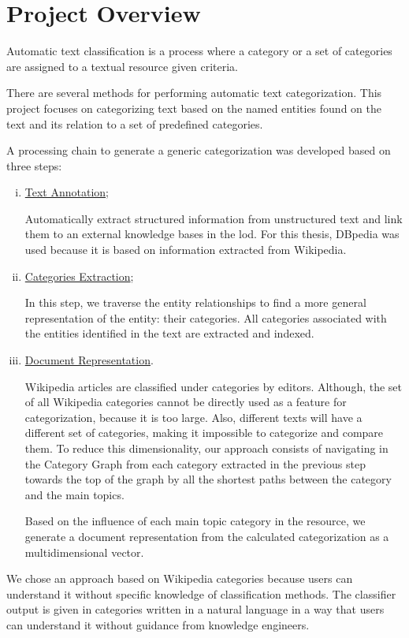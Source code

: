 \section{\hspace*{3pt} Project Overview}

Automatic text classification is a process where a category or a set of categories are assigned to a textual resource given criteria.

There are several methods for performing automatic text categorization. This project focuses on categorizing text based on the named entities found on the text and its relation to a set of predefined categories.

A processing chain to generate a generic categorization was developed based on three steps:

\begin{enumerate}[(i)]
\item \hyperref[sec:text-annotation]{Text Annotation};

Automatically extract structured information from unstructured text and link them to an external knowledge bases in the \gls{lod}. For this thesis, DBpedia was used because it is based on information extracted from Wikipedia.

\item \hyperref[sec:categories-extraction]{Categories Extraction};

In this step, we traverse the entity relationships to find a more general representation of the entity: their categories. All categories associated with the entities identified in the text are extracted and indexed.

\item \hyperref[sec:doc-representation]{Document Representation}.

Wikipedia articles are classified under categories by editors. Although, the set of all Wikipedia categories cannot be directly used as a feature for categorization, because it is too large. Also,  different texts will have a different set of categories, making it impossible to categorize and compare them. To reduce this dimensionality, our approach consists of navigating in the Category Graph from each category extracted in the previous step towards the top of the graph by all the shortest paths between the category and the main topics. 

Based on the influence of each main topic category in the resource, we generate a document representation from the calculated categorization as a multidimensional vector.

\end{enumerate}
We chose an approach based on Wikipedia categories because users can understand it without specific knowledge of classification methods. The classifier output is given in categories written in a natural language in a way that users can understand it without guidance from knowledge engineers. 



